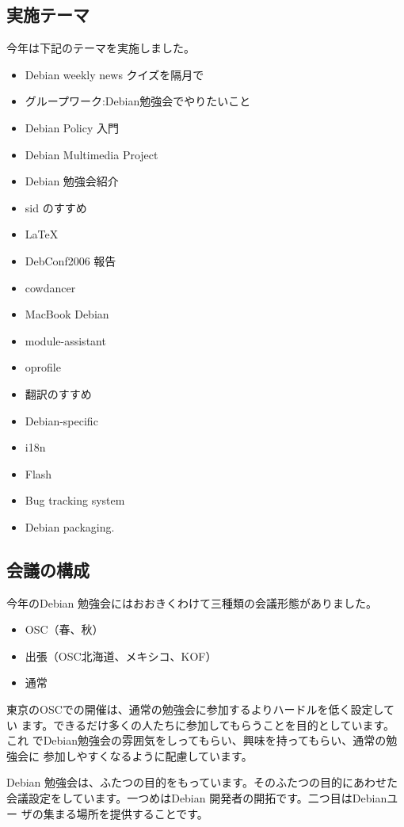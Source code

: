 \documentclass[mingoth,a4paper]{jsarticle}
\begin{document}
\subsection{実施テーマ}

今年は下記のテーマを実施しました。
\begin{itemize}
 \item Debian weekly news クイズを隔月で
 \item グループワーク:Debian勉強会でやりたいこと
 \item Debian Policy 入門
 \item Debian Multimedia Project
 \item Debian 勉強会紹介
 \item sid のすすめ
 \item LaTeX 
 \item DebConf2006 報告
 \item cowdancer 
 \item MacBook Debian
 \item module-assistant
 \item oprofile
 \item 翻訳のすすめ
 \item Debian-specific
 \item i18n
 \item Flash
 \item Bug tracking system
 \item Debian packaging.
\end{itemize}

\subsection{会議の構成}

今年のDebian 勉強会にはおおきくわけて三種類の会議形態がありました。

\begin{itemize}
 \item OSC（春、秋）
 \item 出張（OSC北海道、メキシコ、KOF）
 \item 通常
\end{itemize}

東京のOSCでの開催は、通常の勉強会に参加するよりハードルを低く設定してい
ます。できるだけ多くの人たちに参加してもらうことを目的としています。これ
でDebian勉強会の雰囲気をしってもらい、興味を持ってもらい、通常の勉強会に
参加しやすくなるように配慮しています。

Debian 勉強会は、ふたつの目的をもっています。そのふたつの目的にあわせた
会議設定をしています。一つめはDebian 開発者の開拓です。二つ目はDebianユー
ザの集まる場所を提供することです。
\end{document}
